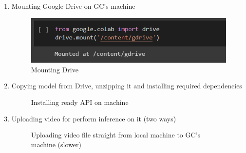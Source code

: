 \begin{enumerate}
    \item Mounting Google Drive on GC's machine
    \newline \begin{figure} [h]
        \centering
        \includegraphics{images/train1}
        \caption{Mounting Drive}
        \label{fig:inference0}
    \end{figure}
    \item Copying model from Drive, unzipping it and installing required dependencies 
    \newline \begin{figure} [h]
        \centering
        \caption{Installing ready API on machine}
        \label{fig:inference1}
    \end{figure}
    \item Uploading video for perform inference on it (two ways)
    \newline \begin{figure} [h]
        \centering
        \caption{Uploading video file straight from local machine to GC's machine (slower)}
        \label{fig:inference2}
    \end{figure}
    \newline \begin{figure} [h]
        \centering

\end{figure}
\end{enumerate}
